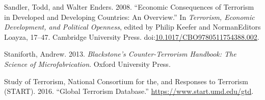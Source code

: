 \documentclass[]{AEA}
\begin{document}
\hypertarget{ref-sandler_enders_2008}{}
Sandler, Todd, and Walter Enders. 2008. ``Economic Consequences of
Terrorism in Developed and Developing Countries: An Overview.'' In
\emph{Terrorism, Economic Development, and Political Openness}, edited
by Philip Keefer and NormanEditors Loayza, 17--47. Cambridge University
Press.
doi:\href{https://doi.org/10.1017/CBO9780511754388.002}{10.1017/CBO9780511754388.002}.

\hypertarget{ref-Blackstone}{}
Staniforth, Andrew. 2013. \emph{Blackstone's Counter-Terrorism Handbook:
The Science of Microfabrication}. Oxford University Press.

\hypertarget{ref-GTD}{}
Study of Terrorism, National Consortium for the, and Responses to
Terrorism (START). 2016. ``Global Terrorism Database.''
\url{https://www.start.umd.edu/gtd}.
\end{document}
